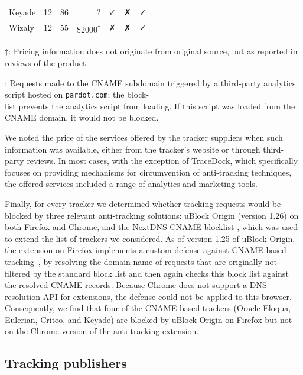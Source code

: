 \begin{table}
\begin{threeparttable}
{\begin{tabular}{ M{3.8cm} r r r c c c }
				Keyade & 12 & 86 & ?\hphantom{\textsuperscript{$\dagger$}} & \faCheck & \faClose & \faCheck \\
				Wizaly & 12 & 55 & \$2000\textsuperscript{$\dagger$} & \faClose & \faClose & \faCheck \\
				\hline
		\end{tabular}}
	\end{threeparttable}
	\begin{tablenotes}
		\small
		\item $\dagger$: Pricing information does not originate from original source, but as reported in reviews of the product. 
		\item *: Requests made to the CNAME subdomain triggered by a third-party analytics script hosted on \texttt{pardot.com}; the block-\\list prevents the analytics script from loading. If this script was loaded from the CNAME domain, it would not be blocked.
	\end{tablenotes}
\end{table}

We noted the price of the services offered by the tracker suppliers when such information was available, either from the tracker's website or through third-party reviews.
In most cases, with the exception of TraceDock, which specifically focuses on providing mechanisms for circumvention of anti-tracking techniques, the offered services included a range of analytics and marketing tools.

Finally, for every tracker we determined whether tracking requests would be blocked by three relevant anti-tracking solutions: uBlock Origin (version 1.26) on both Firefox and Chrome, and the NextDNS CNAME blocklist \cite{cname_cloaking_blocklist}, which was used to extend the list of trackers we considered.
As of version 1.25 of uBlock Origin, the extension on Firefox implements a custom defense against CNAME-based tracking~\cite{ublock-origin-blocks-cname}, by resolving the domain name of requests that are originally not filtered by the standard block list and then again checks this block list against the resolved CNAME records.
Because Chrome does not support a DNS resolution API for extensions, the defense could not be applied to this browser.
Consequently, we find that four of the CNAME-based trackers (Oracle Eloqua, Eulerian, Criteo, and Keyade) are blocked by uBlock Origin on Firefox but not on the Chrome version of the anti-tracking extension.


\subsection{Tracking publishers}

